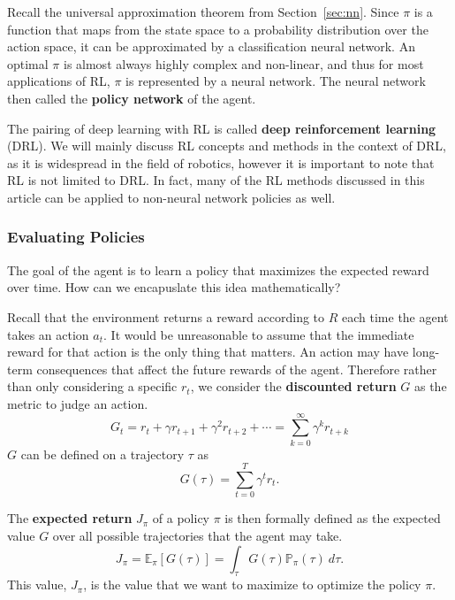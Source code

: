 \documentclass[12pt]{report}
\theoremstyle{definition}
\theoremstyle{remark}
\begin{document}
Recall the universal approximation theorem from Section~\ref{sec:nn}. Since $\pi$ is a function that maps from the state space to a probability distribution over the action space, it can be approximated by a classification neural network. An optimal $\pi$ is almost always highly complex and non-linear, and thus for most applications of RL, $\pi$ is represented by a neural network. The neural network then called the \textbf{policy network} of the agent.

The pairing of deep learning with RL is called \textbf{deep reinforcement learning} (DRL). We will mainly discuss RL concepts and methods in the context of DRL, as it is widespread in the field of robotics, however it is important to note that RL is not limited to DRL\@. In fact, many of the RL methods discussed in this article can be applied to non-neural network policies as well.

\subsubsection{Evaluating Policies}
The goal of the agent is to learn a policy that maximizes the expected reward over time. How can we encapuslate this idea mathematically?

Recall that the environment returns a reward according to $R$ each time the agent takes an action $a_t$. It would be unreasonable to assume that the immediate reward for that action is the only thing that matters. An action may have long-term consequences that affect the future rewards of the agent. Therefore rather than only considering a specific $r_t$, we consider the \textbf{discounted return} $G$ as the metric to judge an action.
\begin{equation}
    G_t = r_t + \gamma r_{t+1} + \gamma^2 r_{t+2} + \cdots = \sum_{k=0}^{\infty} \gamma^k r_{t+k}
\end{equation}
$G$ can be defined on a trajectory $\tau$ as
\begin{equation}
    G(\tau) = \sum_{t=0}^{T} \gamma^t r_t.
\end{equation}

The \textbf{expected return} $J_\pi$ of a policy $\pi$ is then formally defined as the expected value $G$ over all possible trajectories that the agent may take.
\begin{equation}\label{eq:expected-return}
    J_\pi = \mathbb{E}_\pi[G(\tau)] = \int_{\tau} G(\tau)\mathbb{P}_\pi(\tau)\ d\tau.
\end{equation}
This value, $J_\pi$, is the value that we want to maximize to optimize the policy $\pi$.
\end{document}
